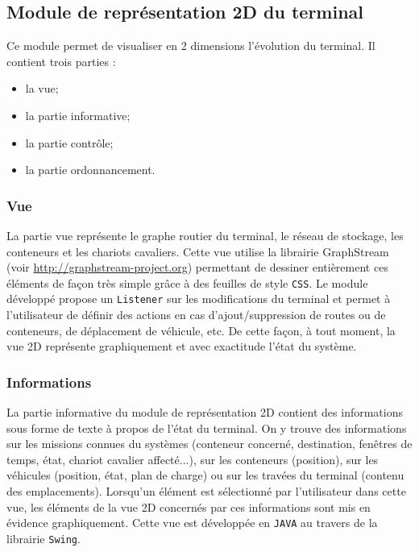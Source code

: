 \subsection{Module de représentation 2D du terminal}

Ce module permet de visualiser en 2 dimensions l'évolution du terminal. Il contient trois parties :
\begin{itemize}
 \item la vue;
 \item la partie informative;
 \item la partie contrôle;
 \item la partie ordonnancement.
\end{itemize}

\subsubsection{Vue}

La partie vue représente le graphe routier du terminal, le réseau de stockage, les conteneurs et les chariots cavaliers. Cette vue utilise la librairie GraphStream (voir \href{http://graphstream-project.org}{http://graphstream-project.org}) permettant de dessiner entièrement ces éléments de façon très simple grâce à des feuilles de style \verb!CSS!. Le module développé propose un \verb!Listener! sur les modifications du terminal et permet à l'utilisateur de définir des actions en cas d'ajout/suppression de routes ou de conteneurs, de déplacement de véhicule, etc. De cette façon, à tout moment, la vue 2D représente graphiquement et avec exactitude l'état du système.

\subsubsection{Informations}

La partie informative du module de représentation 2D contient des informations sous forme de texte à propos de l'état du terminal. On y trouve des informations sur les missions connues du systèmes (conteneur concerné, destination, fenêtres de temps, état, chariot cavalier affecté...), sur les conteneurs (position), sur les véhicules (position, état, plan de charge) ou sur les travées du terminal (contenu des emplacements). Lorsqu'un élément est sélectionné par l'utilisateur dans cette vue, les éléments de la vue 2D concernés par ces informations sont mis en évidence graphiquement. Cette vue est développée en \verb!JAVA! au travers de la librairie \verb!Swing!.

